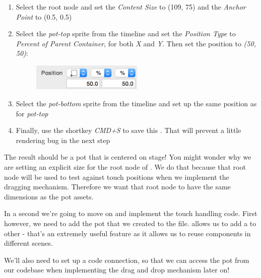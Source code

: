 \begin{leftbar}
\begin{enumerate}
  \item Select the root node and set the \textit{Content Size} to (109, 75) and
  the \textit{Anchor Point} to (0.5, 0.5)
  \item Select the \textit{pot-top} sprite from the timeline and set the
  \textit{Position Type} to \textit{Percent of Parent Container}, for both
  \textit{X} and \textit{Y}. Then set the position to \textit{(50, 50)}:
  \begin{figure}[H]
    \centering
    \includegraphics[width=150pt]{images/Chapter3/pot_top_position.png}
  \end{figure}
  \item Select the \textit{pot-bottom} sprite from the timeline and set up the
  same position as for \textit{pot-top}
  \item Finally, use the shortkey \textit{CMD+S} to save this \ccbfile{}. That
  will prevent a little rendering bug in the next step
\end{enumerate}
\end{leftbar}

The result should be a pot that is centered on stage! You might wonder why we
are setting an explicit size for the root node of . We do
that because that root node will be used to test against touch positions when we
implement the dragging mechanism. Therefore we want that root node to have the
same dimensions as the pot assets.

In a second we're going to move on and implement the touch handling code. First
however, we need to add the pot that we created to the
 file. \SB{} allows us to add a \ccbfile{} to other
\ccbfiles{} - that's an extremely useful feature as it allows us to reuse
components in different scenes.

We'll also need to set up a code connection, so that we can access the pot
from our codebase when implementing the drag and drop mechanism later on!

